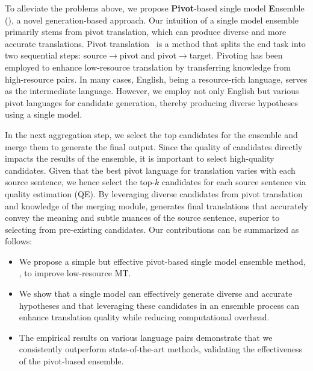To alleviate the problems above, we propose \textbf{Pivot}-based single model \textbf{E}nsemble (\ours), a novel generation-based approach.
Our intuition of a single model ensemble primarily stems from pivot translation, which can produce diverse and more accurate translations.
Pivot translation~\cite{wu-wang-2007-pivot, utiyama-isahara-2007-comparison} is a method that splits the end task into two sequential steps: source$\rightarrow$pivot and pivot$\rightarrow$target.
Pivoting has been employed to enhance low-resource translation by transferring knowledge from high-resource pairs.
In many cases, English, being a resource-rich language, serves as the intermediate language.
However, we employ not only English but various pivot languages for candidate generation, thereby producing diverse hypotheses using a single model.

In the next aggregation step, we select the top candidates for the ensemble and merge them to generate the final output.
Since the quality of candidates directly impacts the results of the ensemble, it is important to select high-quality candidates.
Given that the best pivot language for translation varies with each source sentence, we hence select the top-$\textit{k}$ candidates for each source sentence via quality estimation (QE).
By leveraging diverse candidates from pivot translation and knowledge of the merging module, \ours generates final translations that accurately convey the meaning and subtle nuances of the source sentence, superior to selecting from pre-existing candidates.
Our contributions can be summarized as follows:

\begin{itemize}
    \item We propose a simple but effective pivot-based single model ensemble method, \ours, to improve low-resource MT.

    \item We show that a single model can effectively generate diverse and accurate hypotheses and that leveraging these candidates in an ensemble process can enhance translation quality while reducing computational overhead.

    \item The empirical results on various language pairs demonstrate that we consistently outperform state-of-the-art methods, validating the effectiveness of the pivot-based ensemble.
\end{itemize}